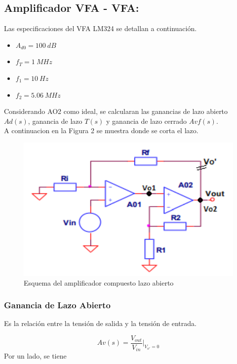 \documentclass[a4paper,12pt]{article}
\begin{document}
\subsection{Amplificador VFA - VFA:}
\vspace{0,2cm}
\hspace{1mm}Las especificaciones del VFA LM324 se detallan a continuaci\'on.

\begin{itemize}
    \item $A_{d0}=100~dB$
    \item $f_T=1~MHz$
    \item $f_1=10~Hz$
    \item $f_2=5.06~MHz$
\end{itemize}
\vspace{0,2cm}
\hspace{1mm}Considerando AO2 como ideal, se calcularan las ganancias de lazo abierto $Ad(s)$, ganancia de lazo $T(s)$ y ganancia de lazo cerrado $Avf(s)$.\\
\vspace{0.2cm}
\hspace{1mm}A continuacion en la Figura 2 se muestra donde se corta el lazo.
\begin{figure}[h]
    \centering
    \includegraphics[width=0.5\linewidth]{CircuitoLazoAbierto.png}
    \caption{Esquema del amplificador compuesto lazo abierto}
    \label{fig:enter-label}
\end{figure}
\subsubsection{Ganancia de Lazo Abierto}
\vspace{0,2cm}
\hspace{1mm}Es la relación entre la tensión de salida y la tensión de entrada.

\begin{equation}
    Av(s) = \frac{V_{out}}{V_{in}}|_{V_{o'}=0}  
\end{equation}
\vspace{0,2cm}
\hspace{1mm}Por un lado, se tiene
\end{document}
